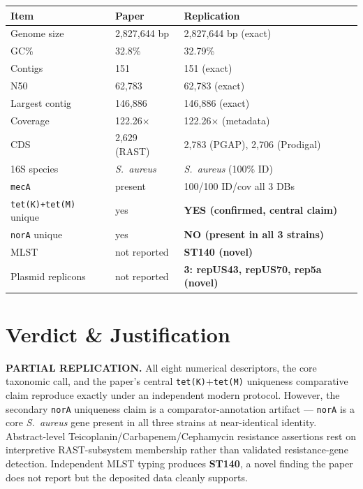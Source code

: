 \documentclass[11pt]{article}
\begin{document}
\begin{center}
\begin{tabular}{@{}lll@{}}
\toprule
Item & Paper & Replication \\ \midrule
Genome size & 2{,}827{,}644 bp & 2{,}827{,}644 bp (exact) \\
GC\% & 32.8\% & 32.79\% \\
Contigs & 151 & 151 (exact) \\
N50 & 62{,}783 & 62{,}783 (exact) \\
Largest contig & 146{,}886 & 146{,}886 (exact) \\
Coverage & 122.26$\times$ & 122.26$\times$ (metadata) \\
CDS & 2{,}629 (RAST) & 2{,}783 (PGAP), 2{,}706 (Prodigal) \\
16S species & \emph{S.\ aureus} & \emph{S.\ aureus} (100\% ID) \\
\texttt{mecA} & present & 100/100 ID/cov all 3 DBs \\
\texttt{tet(K)+tet(M)} unique & yes & \textbf{YES (confirmed, central claim)} \\
\texttt{norA} unique & yes & \textbf{NO (present in all 3 strains)} \\
MLST & not reported & \textbf{ST140 (novel)} \\
Plasmid replicons & not reported & \textbf{3: repUS43, repUS70, rep5a (novel)} \\
\bottomrule
\end{tabular}
\end{center}

\section{Verdict \& Justification}

\textbf{PARTIAL REPLICATION.} All eight numerical descriptors, the
core taxonomic call, and the paper's central \texttt{tet(K)}+\texttt{tet(M)}
uniqueness comparative claim reproduce exactly under an independent
modern protocol. However, the secondary \texttt{norA} uniqueness claim
is a comparator-annotation artifact --- \texttt{norA} is a core
\emph{S.\ aureus} gene present in all three strains at near-identical
identity. Abstract-level Teicoplanin/Carbapenem/Cephamycin resistance
assertions rest on interpretive RAST-subsystem membership rather than
validated resistance-gene detection. Independent MLST typing produces
\textbf{ST140}, a novel finding the paper does not report but the
deposited data cleanly supports.
\end{document}
